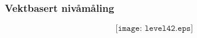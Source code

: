 \documentclass[aspectratio=169,xcolor=dvipsnames]{beamer}
\begin{document}
%
%
%
%
\begin{frame}
	\frametitle{Vektbasert nivåmåling}

$$\texttt{[image: level42.eps]}$$
\end{frame}
%
%
%
%
\end{document}
